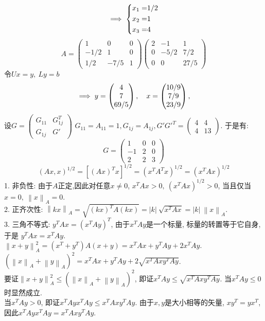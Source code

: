 \documentclass[UTF8,9pt]{ctexart}
\begin{document}
$$\implies \left\{\begin{aligned} 
    x_1 =& 1/2\\  
    x_2 =& 1\\
    x_3 =& 4
     \end{aligned}\right.$$
$$A=
\begin{pmatrix}
    1    & 0    & 0 \\
    -1/2 & 1    & 0 \\
    1/2  & -7/5 & 1
\end{pmatrix}
\begin{pmatrix}
    2 & -1 & 1    \\
    0 & -5/2 & 7/2    \\
    0 & 0  & 27/5  
\end{pmatrix}$$
令$Ux=y,\ Ly=b$ $$\implies y=
\begin{pmatrix}
    4    \\
    7    \\
    69/5
\end{pmatrix},\quad x=
\begin{pmatrix}
    10/9 \\
    7/9  \\
    23/9  
\end{pmatrix},
$$
设$G=
\begin{pmatrix}
    G_{11} & G_{1j}^T \\
    G_{1j}      & G'
\end{pmatrix}$
$G_{11}=A_{11}=1, G_{1j}=A_{1j}, G'G'^T=
\begin{pmatrix}
    4 & 4 \\
    4 & 13
\end{pmatrix}$. 于是有:
$$G=
\begin{pmatrix}
    1  & 0 & 0 \\
    -1 & 2 & 0 \\
    2  & 2 & 3
\end{pmatrix}
$$
$$(Ax,x)^{1/2}=[(Ax)^Tx]^{1/2}=(x^TA^Tx)^{1/2}=(x^TAx)^{1/2}$$
1. 非负性: 由于$A$正定,因此对任意$x \neq 0$, $x^TAx>0,\ (x^TAx)^{1/2}>0$, 当且仅当$x=0,\ \left\|x\right\|_A=0$.\\
2. 正齐次性: $\left\|kx\right\|_A=\sqrt{(kx)^TA(kx)}=|k|\ \sqrt{x^TAx}=|k|\ \left\|x\right\|_A$.\\
3. 三角不等式: $y^TAx=(x^TAy)^T$, 由于$x^TAy$是一个标量, 标量的转置等于它自身, 于是 $y^TAx=x^TAy$. \\
$\left\|x+y\right\|^2_A=(x^T+y^T)A(x+y)=x^TAx+y^TAy+2x^TAy$.\\
$(\left\|x\right\|_A+\left\|y\right\|_A)^2=x^TAx+y^TAy+2\sqrt{x^TAxy^TAy}$.\\
要证$\left\|x+y\right\|^2_A \leq (\left\|x\right\|_A+\left\|y\right\|_A)^2$, 即证$x^TAy \leq \sqrt{x^TAxy^TAy}$. 当$x^TAy \leq 0$时显然成立. \\
当$x^TAy>0$, 即证$x^TAyx^TAy \leq x^TAxy^TAy$. 由于$x,y$是大小相等的矢量, $xy^T=yx^T$, 因此$x^TAyx^TAy = x^TAxy^TAy$.\\
\end{document}
